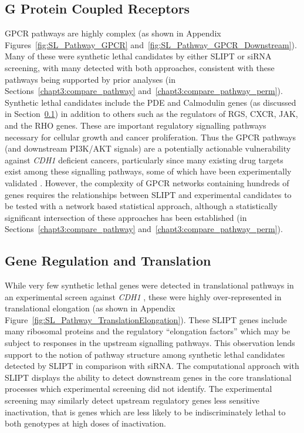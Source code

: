 \FloatBarrier

\subsection{G Protein Coupled Receptors}  \label{chapt4:SL_Genes_GPCR}

\acrfull{GPCR} pathways are highly complex (as shown in Appendix Figures~\ref{fig:SL_Pathway_GPCR} and~\ref{fig:SL_Pathway_GPCR_Downstream}). Many of these were synthetic lethal candidates by either \gls{SLIPT} or \gls{siRNA} screening, with many detected with both approaches, consistent with these pathways being supported by prior analyses (in Sections~\ref{chapt3:compare_pathway} and~\ref{chapt3:compare_pathway_perm}). Synthetic lethal candidates include the \gls{PDE} and Calmodulin genes (as discussed in Section~\ref{chapt4:SL_Genes_GPCR}) in addition to others such as the regulators of \gls{RGS}, \gls{CXCR}, \acrfull{JAK}, and the \gls{RHO} genes. These are important regulatory signalling pathways necessary for cellular growth and cancer proliferation. Thus the GPCR pathways (and downstream PI3K/AKT signals) are a potentially actionable vulnerability against \textit{CDH1} deficient cancers, particularly since many existing drug targets exist among these signalling pathways, some of which have been experimentally validated \citep{Telford2015, KellyHDGC}. However, the complexity of GPCR networks containing hundreds of genes requires the relationships between \gls{SLIPT} and experimental candidates to be tested with a network based statistical approach, although a statistically significant intersection of these approaches has been established (in Sections~\ref{chapt3:compare_pathway} and~\ref{chapt3:compare_pathway_perm}).



\FloatBarrier

\subsection{Gene Regulation and Translation}  \label{chapt4:SL_Genes_Translation}

While very few synthetic lethal genes were detected in translational pathways in an experimental screen against \textit{CDH1} \cite{Telford2015}, these were highly over-represented in translational elongation (as shown in Appendix Figure~\ref{fig:SL_Pathway_TranslationElongation}). These \gls{SLIPT} genes include many ribosomal proteins and the regulatory ``elongation factors'' which may be subject to responses in the upstream signalling pathways. This observation lends support to the notion of pathway structure among synthetic lethal candidates detected by \gls{SLIPT} in comparison with \gls{siRNA}. The computational approach with \gls{SLIPT} displays the ability to detect downstream genes in the core translational processes which experimental screening did not identify. The experimental screening may similarly detect upstream regulatory genes less sensitive inactivation, that is genes which are less likely to be indiscriminately lethal to both genotypes at high doses of inactivation.

